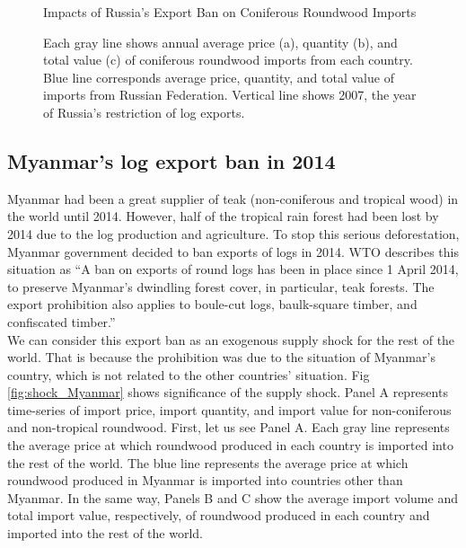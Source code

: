 \documentclass[a4paper,12pt]{article}
\begin{document}
\begin{figure}[H]
    \centering
    \caption{Impacts of Russia's Export Ban on Coniferous Roundwood Imports}
    \caption*{\small{Each gray line shows annual average price (a), quantity (b), and total value (c) of coniferous roundwood imports from each country. Blue line corresponds average price, quantity, and total value of imports from Russian Federation. Vertical line shows 2007, the year of Russia's restriction of log exports.}}
    \label{fig:shock_russia}
\end{figure}

\subsection{Myanmar's log export ban in 2014}
Myanmar had been a great supplier of teak (non-coniferous and tropical wood) in the world until 2014. However, half of the tropical rain forest had been lost by 2014 due to the log production and agriculture. To stop this serious deforestation, Myanmar government decided to ban exports of logs in 2014. WTO describes this situation as ``A ban on exports of round logs has been in place since 1 April 2014, to preserve Myanmar's dwindling forest cover, in particular, teak forests. The export prohibition also applies to boule-cut logs, baulk-square timber, and confiscated timber.'' \\

We can consider this export ban as an exogenous supply shock for the rest of the world. That is because the prohibition was due to the situation of Myanmar's country, which is not related to the other countries' situation. Fig \ref{fig:shock_Myanmar} shows significance of the supply shock. Panel A represents time-series of import price, import quantity, and import value for non-coniferous and non-tropical roundwood. First, let us see Panel A. Each gray line represents the average price at which roundwood produced in each country is imported into the rest of the world. The blue line represents the average price at which roundwood produced in Myanmar is imported into countries other than Myanmar. In the same way, Panels B and C show the average import volume and total import value, respectively, of roundwood produced in each country and imported into the rest of the world.\\
\end{document}
